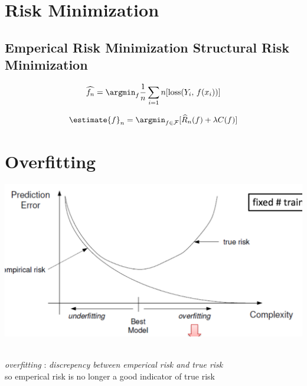 \documentclass[18pt,a3paper,landscape, ncols=3]{cheatsheet}
\begin{document}
\section{Risk Minimization} \seperator
	\subsection{Emperical Risk Minimization \qquad\qquad\qquad\quad Structural Risk Minimization}
		\begin{mdframed}
			\begin{minipage}{0.5\textwidth}
				\[
					\widehat{f_n} = \argmin_{f} \frac{1}{n} \sum_{i=1}{n} [\mathrm{loss}(Y_i,\, f(x_i))]
				\]
			\end{minipage}%
			\quad\vrule\quad%
			\begin{minipage}{0.5\textwidth}
				\[
					\estimate{f}_{n} = \argmin_{f \in \mathcal{F}} \lbrack \widehat{R}_{n}(f) + \lambda C(f) \rbrack
				\]
			\end{minipage}
		\end{mdframed}

\section{Overfitting} \seperator
	\begin{mdframed}
		\begin{minipage}{\textwidth}
			\begin{center}
        \centering
        \includegraphics{overfitting.png}
      \end{center}
		\end{minipage}\\
		\textit{overfitting} : \textit{discrepency between emperical risk and true risk}\\
		so emperical risk is no longer a good indicator of true risk
	\end{mdframed}
\end{document}
